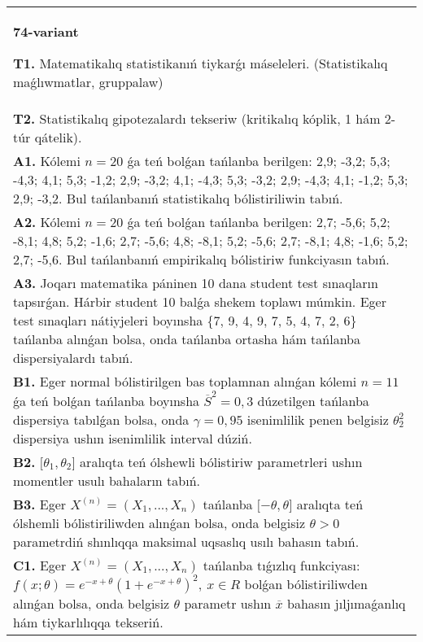 \documentclass{article}
\begin{document}
\begin{tabular}{m{17cm}}
\end{tabular}
\vspace{1cm}


\begin{tabular}{m{17cm}}
\textbf{74-variant}
\newline

\textbf{T1.} Matematikalıq statistikanıń tiykarǵı máseleleri. (Statistikalıq maǵlıwmatlar, gruppalaw)
 \\
\textbf{T2.} 
Statistikalıq gipotezalardı tekseriw (kritikalıq kóplik, 1 hám 2-túr qátelik).
 \\
\textbf{A1.} 
Kólemi \(n = 20\) ǵa teń bolǵan tańlanba berilgen: 2,9; -3,2; 5,3; -4,3; 4,1; 5,3; -1,2; 2,9; -3,2; 4,1; -4,3; 5,3; -3,2; 2,9; -4,3; 4,1; -1,2; 5,3; 2,9; -3,2. Bul tańlanbanıń statistikalıq bólistiriliwin tabıń.
 \\
\textbf{A2.} 
Kólemi \(n = 20\) ǵa teń bolǵan tańlanba berilgen: 2,7; -5,6; 5,2; -8,1; 4,8; 5,2; -1,6; 2,7; -5,6; 4,8; -8,1; 5,2; -5,6; 2,7; -8,1; 4,8; -1,6; 5,2; 2,7; -5,6. Bul tańlanbanıń empirikalıq bólistiriw funkciyasın tabıń.
 \\
\textbf{A3.} 
Joqarı matematika páninen 10 dana student test sınaqların tapsırǵan. Hárbir student 10 balǵa shekem toplawı múmkin. Eger test sınaqları nátiyjeleri boyınsha \{7, 9, 4, 9, 7, 5, 4, 7, 2, 6\} tańlanba alınǵan bolsa, onda tańlanba ortasha hám tańlanba dispersiyalardı tabıń.
 \\
\textbf{B1.} 
Eger normal bólistirilgen bas toplamnan alınǵan kólemi \(n = 11\) ǵa teń bolǵan tańlanba boyınsha \({\overline{S}}^{2} = 0,3\) dúzetilgen tańlanba dispersiya tabılǵan bolsa, onda \(\gamma = 0,95\) isenimlilik penen belgisiz \(\theta_{2}^{2}\) dispersiya ushın isenimlilik interval dúziń.
 \\
\textbf{B2.} 
\(\lbrack\theta_{1},\theta_{2}\rbrack\) aralıqta teń ólshewli bólistiriw parametrleri ushın momentler usulı bahaların tabıń.
 \\
\textbf{B3.} 
Eger \(X^{(n)} = \left( X_{1},...,X_{n} \right)\) tańlanba \(\lbrack - \theta,\theta\rbrack\) aralıqta teń ólshemli bólistiriliwden alınǵan bolsa, onda belgisiz \(\theta > 0\) parametrdiń shınlıqqa maksimal uqsaslıq usılı bahasın tabıń.
 \\
\textbf{C1.} 
Eger \(X^{(n)} = \left( X_{1},...,X_{n} \right)\) tańlanba tıǵızlıq funkciyası: \(f(x;\theta) = e^{- x + \theta}\left( 1 + e^{- x + \theta} \right)^{2},\ x \in R\)
bolǵan bólistiriliwden alınǵan bolsa, onda belgisiz \(\theta\) parametr ushın \(\overline{x}\) bahasın jıljımaǵanlıq hám tiykarlılıqqa tekseriń.

\end{tabular}
\end{document}
